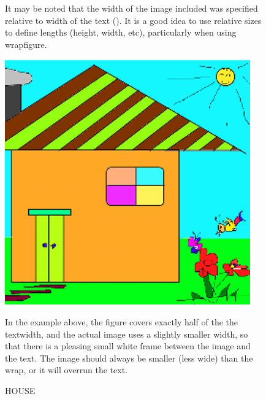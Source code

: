 \documentclass[]{article}
\begin{document}
	\begin{figure}
		
		It may be noted that the width of the image included was specified relative to width of the text (\textwidth). It is a good idea to use relative sizes to define lengths (height, width, etc), particularly when using wrapfigure.
		
		\begin{center}
			\includegraphics[width=0.4\linewidth]{house.png}
		\end{center}
		\caption{HOUSE} 
		
		In the example above, the figure covers exactly half of the the textwidth, and the actual image uses a slightly smaller width, so that there is a pleasing small white frame between the image and the text. The image should always be smaller (less wide) than the wrap, or it will overrun the text.
	\end{figure}
\end{document}
